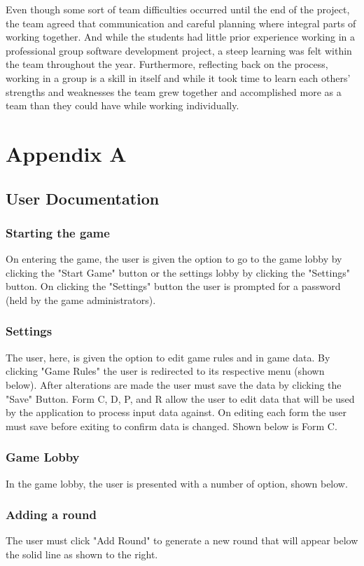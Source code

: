 \documentclass{l3proj}
\begin{document}
Even though some sort of team difficulties occurred until the end of the project, the team agreed that communication and careful planning where integral parts of working together. And while the students had little prior experience working in a professional group software development project, a steep learning was felt within the team throughout the year. Furthermore, reflecting back on the process, working in a group is a skill in itself and while it took time to learn each others' strengths and weaknesses the team grew together and accomplished more as a team than they could have while working individually.
\pagebreak
\section{Appendix A}
\label{sec:appendix}

\subsection{User Documentation}
\subsubsection{Starting the game}
On entering the game, the user is given the option to go to the game lobby by clicking the "Start Game" button or the settings lobby by clicking the "Settings" button. On clicking the "Settings" button the user is prompted for a password (held by the game administrators).

\subsubsection{Settings}
The user, here, is given the option to edit game rules and in game data. 
By clicking "Game Rules" the user is redirected to its respective menu (shown below). After alterations are made the user must save the data by clicking the "Save" Button.
Form C, D, P, and R allow the user to edit data that will be used by the application to process input data against. On editing each form the user must save before exiting to confirm data is changed. 
Shown below is Form C.
\subsubsection{Game Lobby}
In the game lobby, the user is presented with a number of option, shown below.
\subsubsection{Adding a round}
The user must click "Add Round" to generate a new round that will appear below the solid line as shown to the right.
\end{document}
